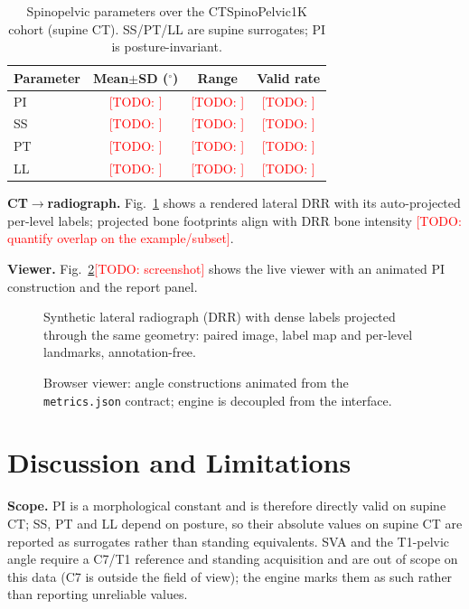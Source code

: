 \documentclass[conference]{IEEEtran}
\newcommand{\TODO}[1]{\textcolor{red}{[TODO: #1]}}
\newcommand{\dataset}{CTSpinoPelvic1K}
\begin{document}
\begin{table}[t]
\caption{Spinopelvic parameters over the \dataset{} cohort (supine CT). SS/PT/LL are
supine surrogates; PI is posture-invariant.}
\label{tab:dist}
\centering
\begin{tabular}{lccc}
\toprule
Parameter & Mean$\pm$SD ($^\circ$) & Range & Valid rate \\
\midrule
PI & \TODO{} & \TODO{} & \TODO{} \\
SS & \TODO{} & \TODO{} & \TODO{} \\
PT & \TODO{} & \TODO{} & \TODO{} \\
LL & \TODO{} & \TODO{} & \TODO{} \\
\bottomrule
\end{tabular}
\end{table}

\textbf{CT$\rightarrow$radiograph.} Fig.~\ref{fig:drr} shows a rendered lateral DRR with
its auto-projected per-level labels; projected bone footprints align with DRR bone
intensity \TODO{quantify overlap on the example/subset}.

\textbf{Viewer.} Fig.~\ref{fig:viewer}\TODO{screenshot} shows the live viewer with an
animated PI construction and the report panel.

\begin{figure}[t]\centering
\fbox{\parbox{0.9\columnwidth}{\centering\vspace{2.2cm}\TODO{Fig: lateral DRR + projected
level labels (example case)}\vspace{2.2cm}}}
\caption{Synthetic lateral radiograph (DRR) with dense labels projected through the same
geometry: paired image, label map and per-level landmarks, annotation-free.}
\label{fig:drr}
\end{figure}

\begin{figure}[t]\centering
\fbox{\parbox{0.9\columnwidth}{\centering\vspace{2.2cm}\TODO{Fig: viewer screenshot ---
animated PI/SS/PT/LL construction + report}\vspace{2.2cm}}}
\caption{Browser viewer: angle constructions animated from the \texttt{metrics.json}
contract; engine is decoupled from the interface.}
\label{fig:viewer}
\end{figure}

\section{Discussion and Limitations}
\label{sec:disc}
\textbf{Scope.} PI is a morphological constant and is therefore directly valid on supine
CT; SS, PT and LL depend on posture, so their absolute values on supine CT are reported as
surrogates rather than standing equivalents. SVA and the T1-pelvic angle require a C7/T1
reference and standing acquisition and are out of scope on this data
(C7 is outside the field of view); the engine marks them as such rather than reporting
unreliable values.
\end{document}
